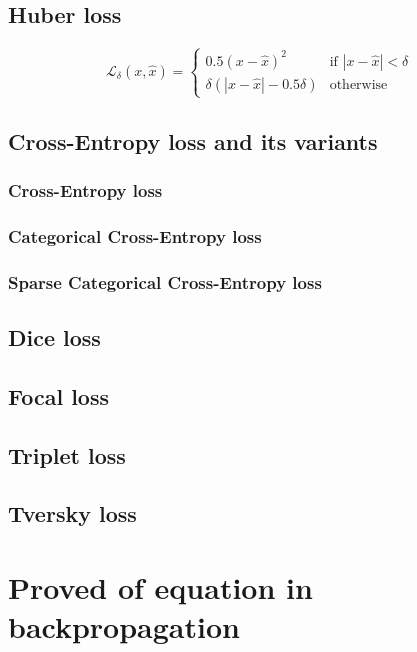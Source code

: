 \subsection{Huber loss}
\begin{equation}
    \mathcal{L}_{\delta}(x,\hat{x}) = \begin{cases}
        0.5(x - \hat{x})^{2} & \text{if } |x-\hat{x}| < \delta\\
        \delta (|x-\hat{x}| - 0.5\delta)& \text{otherwise}
    \end{cases}
\end{equation}
\subsection{Cross-Entropy loss and its variants}

\subsubsection{Cross-Entropy loss}

\subsubsection{Categorical Cross-Entropy loss}

\subsubsection{Sparse Categorical Cross-Entropy loss}

\subsection{Dice loss}

\subsection{Focal loss}

\subsection{Triplet loss}

\subsection{Tversky loss}

\section{Proved of equation in backpropagation}

